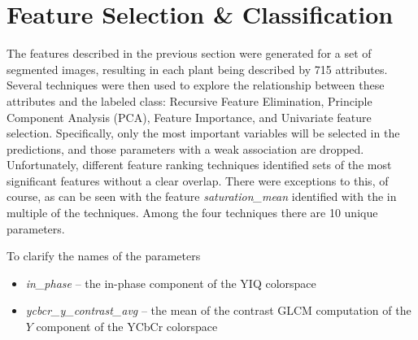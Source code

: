 \documentclass[letterpaper]{article}
\begin{document}
{\section{Feature Selection \& Classification}
The features described in the previous section were generated for a set of segmented images, resulting in each plant being described by 715 attributes. Several techniques were then used to explore the relationship between these attributes and the labeled class: Recursive Feature Elimination, Principle Component Analysis (PCA), Feature Importance, and Univariate feature selection.  Specifically, only the most important variables will be selected in the predictions, and those parameters with a weak association are dropped. Unfortunately, different feature ranking techniques identified sets of the most significant features without a clear overlap. There were exceptions to this, of course, as can be seen with the feature \textit{saturation\_mean} identified with the in multiple of the techniques. Among the four techniques there are 10 unique parameters.

%
%
%
% 

{
\begin{small}
\renewcommand{\arraystretch}{0.9}
\setlength\LTleft{0pt}
\setlength\LTright{0pt}






\end{small}
}


 To clarify the names of the parameters
 \begin{itemize}
 	\item{\textit{in\_phase} -- the in-phase component of the YIQ colorspace}
 	\item{\textit{ycbcr\_y\_contrast\_avg} -- the mean of the contrast GLCM computation of the $Y$ component of the YCbCr colorspace}
 \end{itemize}
 	

}
\end{document}
